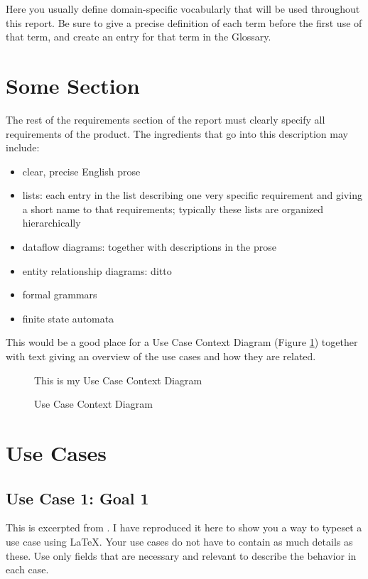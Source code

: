 \documentclass[11pt]{report}
\begin{document}
Here you usually define domain-specific vocabularly that will be used
throughout this report.  Be sure to give a precise definition of each
term before the first use of that term, and create an entry
for that term in the Glossary.

\section{Some Section}

The rest of the requirements section of the report must clearly
specify all requirements of the product.  The ingredients that
go into this description may include:
\begin{itemize}
\item clear, precise English prose
\item lists: each entry in the list describing one very specific
  requirement and giving a short name to that requirements;
  typically these lists are organized hierarchically
\item dataflow diagrams: together with descriptions in the prose
\item entity relationship diagrams: ditto
\item formal grammars
\item finite state automata
\end{itemize}

This would be a good place for a Use Case Context Diagram (Figure
\ref{fig:context}) together with text giving an overview of the use
cases and how they are related.

\begin{figure}
  \begin{center}
    This is my Use Case Context Diagram
  \end{center}
  \caption{Use Case Context Diagram}
  \label{fig:context}
\end{figure}

\section{Use Cases}

\subsection{Use Case 1: Goal 1}
\label{uc:sale}

This is excerpted from \cite{larman}.  I have reproduced it here to
show you a way to typeset a use case using \LaTeX.  Your use cases do
not have to contain as much details as these.  Use only fields that
are necessary and relevant to describe the behavior in each case.
\end{document}
